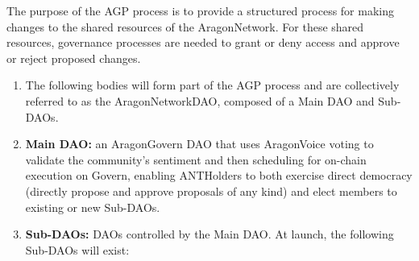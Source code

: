 
\label{chap:AGPProcess}

The purpose of the \acf{AGP} process is to provide a structured process for making changes to the shared resources of the \gls{AragonNetwork}. For these shared resources, governance processes are needed to grant or deny access and approve or reject proposed changes.

\begin{enumerate}
	\begin{enumerate}
		\item The following bodies will form part of the \ac{AGP} process and are collectively referred to as the \gls{AragonNetworkDAO}, composed of a Main \ac{DAO} and Sub-\acp{DAO}.
		\item \textbf{Main \ac{DAO}:} an \gls{AragonGovern} \ac{DAO} that uses \gls{AragonVoice} voting to validate the community’s sentiment and then scheduling for on-chain execution on Govern, enabling \glspl{ANTHolder} to both exercise direct democracy (directly propose and approve proposals of any kind) and elect members to existing or new Sub-\acp{DAO}.
		\item \textbf{Sub-\acp{DAO}:} \acp{DAO} controlled by the Main \ac{DAO}. At launch, the following Sub-\acp{DAO} will exist:
		

\end{enumerate}
\end{enumerate}
